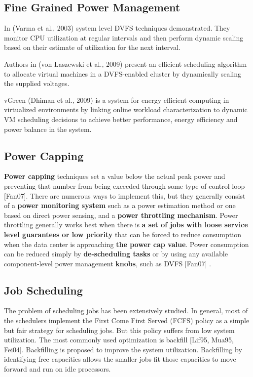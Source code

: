 \documentclass{llncs}
\begin{document}
\subsection{Fine Grained Power Management}
In (Varma et al., 2003) system level DVFS techniques demonstrated. They
monitor CPU utilization at regular intervals and then perform dynamic
scaling based on their estimate of utilization for the next interval.

Authors in (von Laszewski et al., 2009) present an efficient scheduling
algorithm to allocate virtual machines in a DVFS-enabled cluster by
dynamically scaling the supplied voltages.

vGreen (Dhiman et al., 2009) is a system for energy efficient computing in
virtualized environments by linking online workload characterization to
dynamic VM scheduling decisions to achieve better performance, energy
efficiency and power balance in the system.

\subsection{Power Capping}

\textbf{Power capping }techniques set a value below the actual peak power
and preventing that number from being exceeded through some type of control
loop [Fan07]. There are numerous ways to implement this, but they generally
consist of a \textbf{power monitoring system }such as a power estimation
method or one based on direct power sensing, and a \textbf{power throttling
mechanism}. Power throttling generally works best when there is \textbf{a
set of jobs with loose service level guarantees or low priority }that can be
forced to reduce consumption when the data center is approaching \textbf{the
power cap value}. Power consumption can be reduced simply by
\textbf{de-scheduling tasks }or by using any available component-level power
management \textbf{knobs}, such as DVFS [Fan07]
.

\subsection{Job Scheduling}
The problem of scheduling jobs has been extensively studied. In general,
most of the schedulers implement the First Come First Served (FCFS) policy
as a simple but fair strategy for scheduling jobs. But this policy suffers
from low system utilization. The most commonly used optimization is backfill
[Lif95, Mua95, Fei04]. Backfilling is proposed to improve the system
utilization. Backfilling by identifying free capacities allows the smaller
jobs fit those capacities to move forward and run on idle processors.
\end{document}
